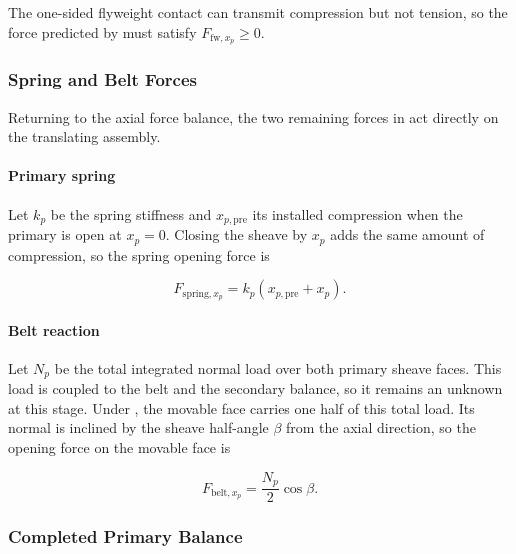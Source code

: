 \documentclass[11pt]{report}
\numberwithin{equation}{section}
\newcounter{assump}
\begin{document}
The one-sided flyweight contact can transmit compression but not tension, so
the force predicted by  must satisfy
\(F_{\mathrm{fw},x_p}\geq0\).


\subsubsection{Spring and Belt Forces}
\label{sec:primary_direct_forces}

Returning to the axial force balance, the two remaining forces in
 act directly on the translating
assembly.

\paragraph{Primary spring}

Let \(k_p\) be the spring stiffness and \(x_{p,\mathrm{pre}}\) its installed
compression when the primary is open at \(x_p=0\). Closing the sheave by
\(x_p\) adds the same amount of compression, so the spring opening force is

\begin{equation}
    F_{\mathrm{spring},x_p}
    =
    k_p\left(x_{p,\mathrm{pre}}+x_p\right).
    \label{eq:primary_spring_force}
\end{equation}

\paragraph{Belt reaction}

Let \(N_p\) be the total integrated normal load over both primary sheave
faces. This load is coupled to the belt and the secondary balance, so it
remains an unknown at this stage. Under
, the movable face carries one half of
this total load. Its normal is inclined by the sheave half-angle
\(\beta\) from the axial direction, so the opening force on the movable face is

\begin{equation}
    F_{\mathrm{belt},x_p}
    =
    \frac{N_p}{2}\cos\beta.
    \label{eq:primary_belt_axial_reaction}
\end{equation}

\subsubsection{Completed Primary Balance}
\label{sec:completed_primary_balance}
\end{document}
